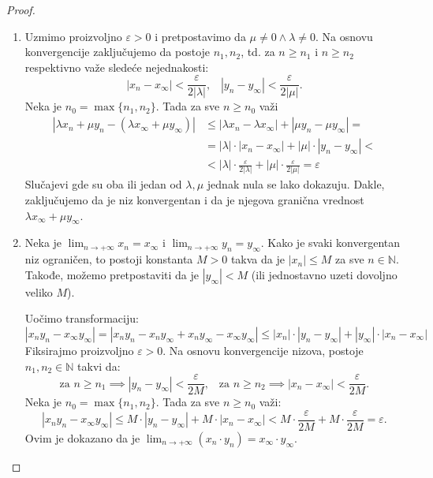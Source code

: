 \documentclass[a4paper,12pt]{article}
\theoremstyle{plain}
\theoremstyle{definition}
\theoremstyle{remark}
\begin{document}
\begin{proof}
    \begin{enumerate}
        \item Uzmimo proizvoljno $\varepsilon > 0$ i pretpostavimo da $\mu \neq 0 \land \lambda \neq 0$. Na osnovu konvergencije zaključujemo da postoje $n_1, n_2$, td. za $n\geq n_1$ i $n \geq n_2$ respektivno
        važe sledeće nejednakosti:
        \[ |x_n - x_\infty| < \frac{\varepsilon}{2|\lambda|}, \;\;\; |y_n - y_\infty| < \frac{\varepsilon}{2|\mu|}.  \]
        Neka je $n_0 = \max\{n_1, n_2\}$. Tada za sve $n \geq n_0$ važi
        \[
            \begin{aligned}
                |\lambda x_n + \mu y_n - (\lambda x_\infty + \mu y_\infty)| &\leq |\lambda x_n - \lambda x_\infty| + |\mu y_n - \mu y_\infty| = \\
                &= |\lambda|\cdot |x_n - x_\infty| + |\mu| \cdot |y_n - y_\infty| < \\
                & < |\lambda| \cdot \frac{\varepsilon}{2 |\lambda|} + |\mu| \cdot \frac{\varepsilon}{2|\mu|} = \varepsilon
            \end{aligned}
        \]  
        Slučajevi gde su oba ili jedan od $\lambda, \mu$ jednak nula se lako dokazuju. Dakle, zaključujemo da je niz konvergentan i da je njegova granična vrednost $\lambda x_\infty + \mu y_\infty$.
        
        \item Neka je $\lim_{n \to +\infty} x_n = x_\infty$ i $\lim_{n \to +\infty} y_n = y_\infty$. Kako je svaki konvergentan niz ograničen, to postoji konstanta $M > 0$ takva da je $|x_n| \leq M$ za sve $n \in \mathbb{N}$. Takođe, možemo pretpostaviti da je $|y_\infty| < M$ (ili jednostavno uzeti dovoljno veliko $M$).
        
        Uočimo transformaciju:
        \[
            |x_n y_n - x_\infty y_\infty| = |x_n y_n - x_n y_\infty + x_n y_\infty - x_\infty y_\infty| \leq |x_n| \cdot |y_n - y_\infty| + |y_\infty| \cdot |x_n - x_\infty|
        \]
        Fiksirajmo proizvoljno $\varepsilon > 0$. Na osnovu konvergencije nizova, postoje $n_1, n_2 \in \mathbb{N}$ takvi da:
        \[
            \text{za } n \geq n_1 \implies |y_n - y_\infty| < \frac{\varepsilon}{2M}, \;\;\; \text{za } n \geq n_2 \implies |x_n - x_\infty| < \frac{\varepsilon}{2M}.
        \]
        Neka je $n_0 = \max\{n_1, n_2\}$. Tada za sve $n \geq n_0$ važi:
        \[
            |x_n y_n - x_\infty y_\infty| \leq M \cdot |y_n - y_\infty| + M \cdot |x_n - x_\infty| < M \cdot \frac{\varepsilon}{2M} + M \cdot \frac{\varepsilon}{2M} = \varepsilon.
        \]
        Ovim je dokazano da je $\lim_{n \to +\infty} (x_n \cdot y_n) = x_\infty \cdot y_\infty$.


\end{enumerate}
\end{proof}
\end{document}
